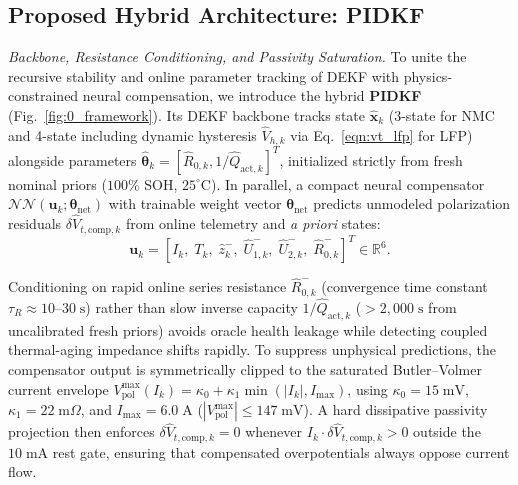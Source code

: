 \documentclass[10pt,a4paper]{article}
\begin{document}
\subsection{Proposed Hybrid Architecture: PIDKF}\label{sec:pidkf}
\emph{Backbone, Resistance Conditioning, and Passivity Saturation.} To unite the recursive stability and online parameter tracking of DEKF with physics-constrained neural compensation, we introduce the hybrid \textbf{PIDKF} (Fig.~\ref{fig:0_framework}). Its DEKF backbone tracks state $\hat{\mathbf{x}}_k$ (3-state for NMC and 4-state including dynamic hysteresis $\hat{V}_{h,k}$ via Eq.~\eqref{eqn:vt_lfp} for LFP) alongside parameters $\hat{\boldsymbol{\theta}}_k = [\hat{R}_{0,k}, 1/\hat{Q}_{\text{act},k}]^T$, initialized strictly from fresh nominal priors ($100\%$ SOH, $25^\circ\text{C}$). In parallel, a compact neural compensator $\mathcal{NN}(\mathbf{u}_k; \boldsymbol{\theta}_{\text{net}})$ with trainable weight vector $\boldsymbol{\theta}_{\text{net}}$ predicts unmodeled polarization residuals $\delta\hat{V}_{t,\text{comp},k}$ from online telemetry and \emph{a priori} states:
\begin{equation}\label{eqn:pidkf_input}
\mathbf{u}_k = \left[I_k,\; T_k,\; \hat{z}_k^-,\; \hat{U}_{1,k}^-,\; \hat{U}_{2,k}^-,\; \hat{R}_{0,k}^-\right]^T \in \mathbb{R}^6.
\end{equation}

Conditioning on rapid online series resistance $\hat{R}_{0,k}^-$ (convergence time constant $\tau_R \approx 10\text{--}30\;\mathrm{s}$) rather than slow inverse capacity $1/\hat{Q}_{\text{act},k}$ ($>2,000\;\mathrm{s}$ from uncalibrated fresh priors) avoids oracle health leakage while detecting coupled thermal-aging impedance shifts rapidly. To suppress unphysical predictions, the compensator output is symmetrically clipped to the saturated Butler--Volmer current envelope $V_{\text{pol}}^{\max}(I_k) = \kappa_0 + \kappa_1 \min(|I_k|, I_{\max})$, using $\kappa_0 = 15\;\mathrm{mV}$, $\kappa_1 = 22\;\mathrm{m}\Omega$, and $I_{\max} = 6.0\;\mathrm{A}$ ($|V_{\text{pol}}^{\max}| \le 147\;\mathrm{mV}$). A hard dissipative passivity projection then enforces $\delta\hat{V}_{t,\text{comp},k} = 0$ whenever $I_k \cdot \delta\hat{V}_{t,\text{comp},k} > 0$ outside the $10\;\mathrm{mA}$ rest gate, ensuring that compensated overpotentials always oppose current flow.
\end{document}
